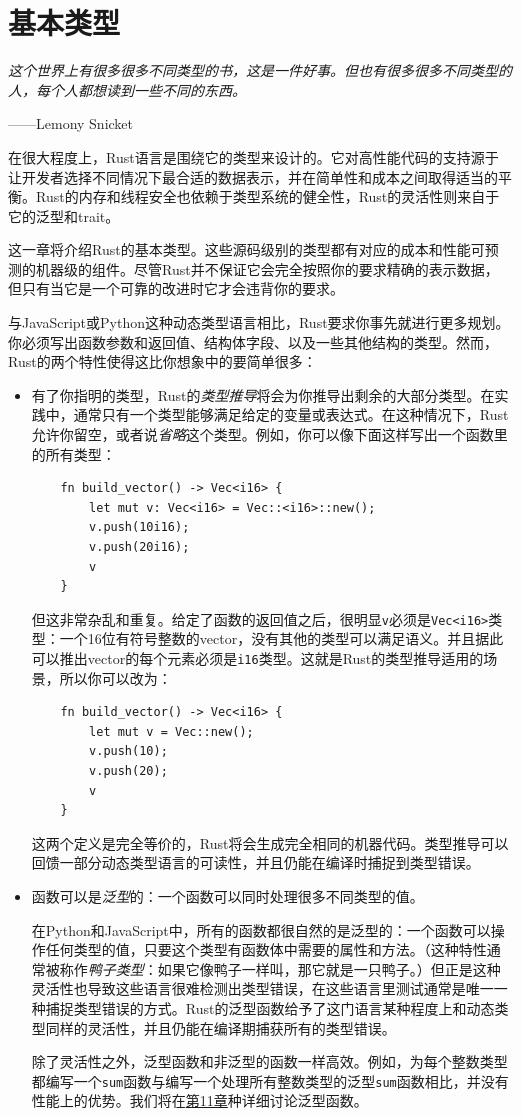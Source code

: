 \chapter{基本类型}\label{ch03}
\emph{这个世界上有很多很多不同类型的书，这是一件好事。但也有很多很多不同类型的人，每个人都想读到一些不同的东西。}
\begin{flushright}
    ——Lemony Snicket
\end{flushright}

在很大程度上，Rust语言是围绕它的类型来设计的。它对高性能代码的支持源于让开发者选择不同情况下最合适的数据表示，并在简单性和成本之间取得适当的平衡。Rust的内存和线程安全也依赖于类型系统的健全性，Rust的灵活性则来自于它的泛型和trait。

这一章将介绍Rust的基本类型。这些源码级别的类型都有对应的成本和性能可预测的机器级的组件。尽管Rust并不保证它会完全按照你的要求精确的表示数据，但只有当它是一个可靠的改进时它才会违背你的要求。

与JavaScript或Python这种动态类型语言相比，Rust要求你事先就进行更多规划。你必须写出函数参数和返回值、结构体字段、以及一些其他结构的类型。然而，Rust的两个特性使得这比你想象中的要简单很多：

\begin{itemize}
    \item 有了你指明的类型，Rust的\emph{类型推导}将会为你推导出剩余的大部分类型。在实践中，通常只有一个类型能够满足给定的变量或表达式。在这种情况下，Rust允许你留空，或者说\emph{省略}这个类型。例如，你可以像下面这样写出一个函数里的所有类型：
    \begin{verbatim}
    fn build_vector() -> Vec<i16> {
        let mut v: Vec<i16> = Vec::<i16>::new();
        v.push(10i16);
        v.push(20i16);
        v
    }
    \end{verbatim}
    但这非常杂乱和重复。给定了函数的返回值之后，很明显\texttt{v}必须是\texttt{Vec<i16>}类型：一个16位有符号整数的vector，没有其他的类型可以满足语义。并且据此可以推出vector的每个元素必须是\texttt{i16}类型。这就是Rust的类型推导适用的场景，所以你可以改为：
    \begin{verbatim}
    fn build_vector() -> Vec<i16> {
        let mut v = Vec::new();
        v.push(10);
        v.push(20);
        v
    }
    \end{verbatim}
    这两个定义是完全等价的，Rust将会生成完全相同的机器代码。类型推导可以回馈一部分动态类型语言的可读性，并且仍能在编译时捕捉到类型错误。
    \item 函数可以是\emph{泛型}的：一个函数可以同时处理很多不同类型的值。

    在Python和JavaScript中，所有的函数都很自然的是泛型的：一个函数可以操作任何类型的值，只要这个类型有函数体中需要的属性和方法。（这种特性通常被称作\emph{鸭子类型}：如果它像鸭子一样叫，那它就是一只鸭子。）但正是这种灵活性也导致这些语言很难检测出类型错误，在这些语言里测试通常是唯一一种捕捉类型错误的方式。Rust的泛型函数给予了这门语言某种程度上和动态类型同样的灵活性，并且仍能在编译期捕获所有的类型错误。

    除了灵活性之外，泛型函数和非泛型的函数一样高效。例如，为每个整数类型都编写一个\texttt{sum}函数与编写一个处理所有整数类型的泛型\texttt{sum}函数相比，并没有性能上的优势。我们将在\hyperref[ch11]{第11章}种详细讨论泛型函数。
\end{itemize}

